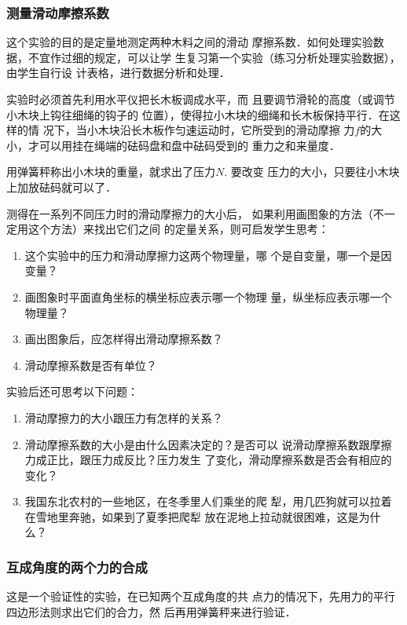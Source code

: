 \subsubsection{测量滑动摩擦系数}

这个实验的目的是定量地测定两种木料之间的滑动
摩擦系数．如何处理实验数据，不宜作过细的规定，可以让学
生复习第一个实验（练习分析处理实验数据），由学生自行设
计表格，进行数据分析和处理．

实验时必须首先利用水平仪把长木板调成水平，而
且要调节滑轮的高度（或调节小木块上钩往细绳的钩子的
位置），使得拉小木块的细绳和长木板保持平行．在这样的情
况下，当小木块沿长木板作匀速运动时，它所受到的滑动摩擦
力$f$的大小，才可以用挂在绳端的砝码盘和盘中砝码受到的
重力之和来量度．

用弹簧秤称出小木块的重量，就求出了压力$N$. 要改变
压力的大小，只要往小木块上加放砝码就可以了．

测得在一系列不同压力时的滑动摩擦力的大小后，
如果利用画图象的方法（不一定用这个方法）来找出它们之间
的定量关系，则可启发学生思考：
\begin{enumerate}
\item 这个实验中的压力和滑动摩擦力这两个物理量，哪
个是自变量，哪一个是因变量？
\item 画图象时平面直角坐标的横坐标应表示哪一个物理
量，纵坐标应表示哪一个物理量？
\item 画出图象后，应怎样得出滑动摩擦系数？
\item 滑动摩擦系数是否有单位？
\end{enumerate}

实验后还可思考以下问题：
\begin{enumerate}
    \item 滑动摩擦力的大小跟压力有怎样的关系？
    \item 滑动摩擦系数的大小是由什么因素决定的？是否可以
    说滑动摩擦系数跟摩擦力成正比，跟压力成反比？压力发生
    了变化，滑动摩擦系数是否会有相应的变化？
    \item 我国东北农村的一些地区，在冬季里人们乘坐的爬
    犁，用几匹狗就可以拉着在雪地里奔驰，如果到了夏季把爬犁
    放在泥地上拉动就很困难，这是为什么？
\end{enumerate}

\subsubsection{互成角度的两个力的合成}

这是一个验证性的实验，在已知两个互成角度的共
点力的情况下，先用力的平行四边形法则求出它们的合力，然
后再用弹簧秤来进行验证．

